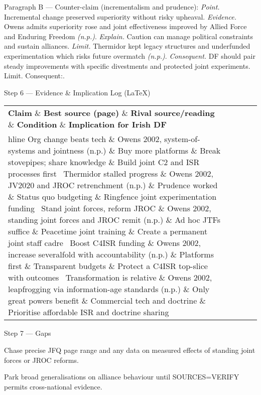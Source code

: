Paragraph B — Counter-claim (incrementalism and prudence):
\textit{Point.} Incremental change preserved superiority without risky upheaval.
\textit{Evidence.} Owens admits superiority rose and joint effectiveness improved by Allied Force and Enduring Freedom \emph{(n.p.)}.
\textit{Explain.} Caution can manage political constraints and sustain alliances.
\textit{Limit.} Thermidor kept legacy structures and underfunded experimentation which risks future overmatch \emph{(n.p.)}.
\textit{Consequent.} DF should pair steady improvements with specific divestments and protected joint experiments. Limit. Consequent:.

Step 6 — Evidence \& Implication Log (LaTeX)

\begin{tabular}{p{3.2cm}p{4.2cm}p{3.6cm}p{3.2cm}p{4.2cm}}
	\textbf{Claim} \& \textbf{Best source (page)} \& \textbf{Rival source/reading} \& \textbf{Condition} \& \textbf{Implication for Irish DF}\\hline
	Org change beats tech \& Owens 2002, system-of-systems and jointness (n.p.) \& Buy more platforms \& Break stovepipes; share knowledge \& Build joint C2 and ISR processes first \
	Thermidor stalled progress \& Owens 2002, JV2020 and JROC retrenchment (n.p.) \& Prudence worked \& Status quo budgeting \& Ringfence joint experimentation funding \
	Stand joint forces, reform JROC \& Owens 2002, standing joint forces and JROC remit (n.p.) \& Ad hoc JTFs suffice \& Peacetime joint training \& Create a permanent joint staff cadre \
	Boost C4ISR funding \& Owens 2002, increase severalfold with accountability (n.p.) \& Platforms first \& Transparent budgets \& Protect a C4ISR top-slice with outcomes \
	Transformation is relative \& Owens 2002, leapfrogging via information-age standards (n.p.) \& Only great powers benefit \& Commercial tech and doctrine \& Prioritise affordable ISR and doctrine sharing \
\end{tabular}

Step 7 — Gaps

Chase precise JFQ page range and any data on measured effects of standing joint forces or JROC reforms.

Park broad generalisations on alliance behaviour until SOURCES=VERIFY permits cross-national evidence.

\parencite{KREPINEVICH_1994}

